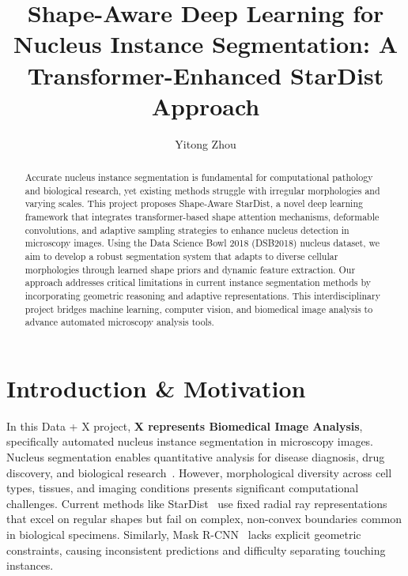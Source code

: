 \documentclass[acmlarge]{acmart}
\begin{document}
\title{Shape-Aware Deep Learning for Nucleus Instance Segmentation: A Transformer-Enhanced StarDist Approach}

\author{Yitong Zhou}

\begin{abstract}
Accurate nucleus instance segmentation is fundamental for computational pathology and biological research, yet existing methods struggle with irregular morphologies and varying scales. This project proposes Shape-Aware StarDist, a novel deep learning framework that integrates transformer-based shape attention mechanisms, deformable convolutions, and adaptive sampling strategies to enhance nucleus detection in microscopy images. Using the Data Science Bowl 2018 (DSB2018) nucleus dataset, we aim to develop a robust segmentation system that adapts to diverse cellular morphologies through learned shape priors and dynamic feature extraction. Our approach addresses critical limitations in current instance segmentation methods by incorporating geometric reasoning and adaptive representations. This interdisciplinary project bridges machine learning, computer vision, and biomedical image analysis to advance automated microscopy analysis tools.
\end{abstract}

\maketitle

\section{Introduction \& Motivation}

In this Data + X project, \textbf{X represents Biomedical Image Analysis}, specifically automated nucleus instance segmentation in microscopy images. Nucleus segmentation enables quantitative analysis for disease diagnosis, drug discovery, and biological research~\cite{schmidt2018cell, caicedo2019nucleus}. However, morphological diversity across cell types, tissues, and imaging conditions presents significant computational challenges. Current methods like StarDist~\cite{schmidt2018cell} use fixed radial ray representations that excel on regular shapes but fail on complex, non-convex boundaries common in biological specimens. Similarly, Mask R-CNN~\cite{he2017mask} lacks explicit geometric constraints, causing inconsistent predictions and difficulty separating touching instances.
\end{document}
